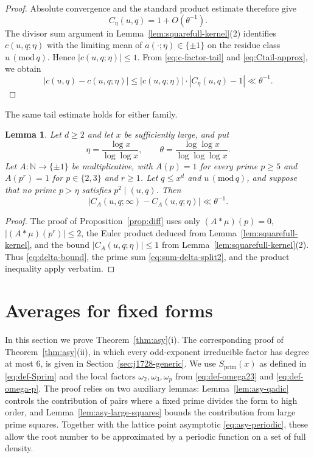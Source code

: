 \documentclass[12pt,reqno]{amsart}
\numberwithin{equation}{section}
\newtheorem{lemma}[theorem]{Lemma}
\theoremstyle{definition}
\renewcommand{\le}{\leqslant}
\renewcommand{\ge}{\geqslant}
\newcommand{\NN}{\mathbb{N}}
\renewcommand{\pmod}[1]{\,(\mathrm{mod}\,#1)}
\begin{document}
\begin{proof}
Absolute convergence and the standard product estimate therefore give
\begin{equation}\label{eq:Ctail-approx}
C_{\eta}(u,q)=1+O(\theta^{-1}).
\end{equation}
The divisor sum argument in Lemma~\ref{lem:squarefull-kernel}(2) identifies $c(u,q;\eta)$ with the limiting mean of $a(\cdot;\eta)\in\{\pm1\}$ on the residue class $u\pmod q$.
Hence $|c(u,q;\eta)|\le 1$.
From \eqref{eq:c-factor-tail} and \eqref{eq:Ctail-approx}, we obtain
\[
|c(u,q)-c(u,q; \eta)|
\le |c(u,q; \eta)| \cdot |C_{\eta}(u,q)-1|
\ll \theta^{-1}.
\]
\end{proof}

The same tail estimate holds for either family.

\begin{lemma}\label{lem:squarefull-tail}
Let $d\ge2$ and let $x$ be sufficiently large, and put
\[
\eta=\frac{\log x}{\log\log x},\qquad
\theta=\frac{\log\log x}{\log\log\log x}.
\]
Let $A:\NN\to\{\pm1\}$ be multiplicative, with $A(p)=1$ for every prime $p\ge5$ and $A(p^r)=1$ for $p\in\{2,3\}$ and $r\ge1$.
Let $q\le x^d$ and $u\pmod q$, and suppose that no prime $p>\eta$ satisfies $p^2\mid(u,q)$.
Then
\[
|C_A(u,q;\infty)-C_A(u,q;\eta)|\ll\theta^{-1}.
\]
\end{lemma}

\begin{proof}
The proof of Proposition~\ref{prop:diff} uses only $(A*\mu)(p)=0$, $|(A*\mu)(p^r)|\le2$, the Euler product deduced from Lemma~\ref{lem:squarefull-kernel}, and the bound $|C_A(u,q;\eta)|\le1$ from Lemma~\ref{lem:squarefull-kernel}(2).
Thus \eqref{eq:delta-bound}, the prime sum \eqref{eq:sum-delta-split2}, and the product inequality apply verbatim.
\end{proof}

\section{Averages for fixed forms}\label{sec:fixed-forms}

In this section we prove Theorem~\ref{thm:asy}(i).
The corresponding proof of Theorem~\ref{thm:asy}(ii), in which every odd-exponent irreducible factor has degree at most $6$, is given in Section~\ref{sec:j1728-generic}.
We use $S_{\mathrm{prim}}(x)$ as defined in \eqref{eq:def-Sprim} and the local factors $\omega_2,\omega_3,\omega_p$ from \eqref{eq:def-omega23} and \eqref{eq:def-omega-p}.
The proof relies on two auxiliary lemmas: Lemma~\ref{lem:asy-qadic} controls the contribution of pairs where a fixed prime divides the form to high order, and Lemma~\ref{lem:asy-large-squares} bounds the contribution from large prime squares.
Together with the lattice point asymptotic \eqref{eq:asy-periodic}, these allow the root number to be approximated by a periodic function on a set of full density.
\end{document}
